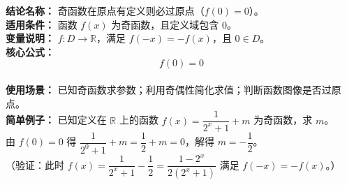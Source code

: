 \textbf{结论名称：} 奇函数在原点有定义则必过原点（$f(0)=0$）。\\
\textbf{适用条件：} 函数 $f(x)$ 为奇函数，且定义域包含 $0$。\\
\textbf{变量说明：} $f:D\to\mathbb{R}$，满足 $f(-x)=-f(x)$，且 $0\in D$。\\
\textbf{核心公式：} \[ \boxed{f(0)=0} \]\\
\textbf{使用场景：} 已知奇函数求参数；利用奇偶性简化求值；判断函数图像是否过原点。\\
\textbf{简单例子：} 已知定义在 $\mathbb{R}$ 上的函数 $f(x)=\dfrac{1}{2^x+1}+m$ 为奇函数，求 $m$。\\
由 $f(0)=0$ 得 $\dfrac{1}{2^0+1}+m=\dfrac{1}{2}+m=0$，解得 $m=-\dfrac12$。\\
（验证：此时 $f(x)=\dfrac{1}{2^x+1}-\dfrac12=\dfrac{1-2^x}{2(2^x+1)}$ 满足 $f(-x)=-f(x)$。）